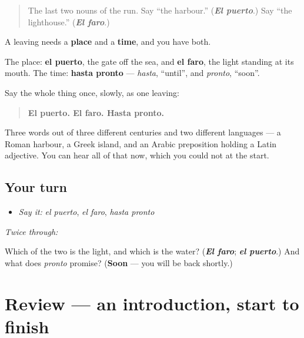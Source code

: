 \begin{quote}
The last two nouns of the run. Say \textquotedblleft{}the harbour.\textquotedblright{} (\emph{\textbf{El puerto}}.) Say \textquotedblleft{}the lighthouse.\textquotedblright{} (\emph{\textbf{El faro}}.)
\end{quote}

\begin{grammarlens}[title={What you've built}]
A leaving needs a \textbf{place} and a \textbf{time}, and you have both.

The place: \textbf{el puerto}, the gate off the sea, and \textbf{el faro}, the light standing at its mouth. The time: \textbf{hasta pronto} — \emph{hasta}, \textquotedblleft{}until\textquotedblright{}, and \emph{pronto}, \textquotedblleft{}soon\textquotedblright{}.

Say the whole thing once, slowly, as one leaving:

\begin{quote}
\textbf{El puerto. El faro. Hasta pronto.}
\end{quote}

Three words out of three different centuries and two different languages — a Roman harbour, a Greek island, and an Arabic preposition holding a Latin adjective. You can hear all of that now, which you could not at the start.
\end{grammarlens}

\subsection*{Your turn}
\begin{itemize}
\raggedright
  \item \emph{Say it:} \emph{el puerto}, \emph{el faro}, \emph{hasta pronto}
\end{itemize}

\emph{Twice through:}

\begin{tcolorbox}[breakable,colback=teal!4,colframe=teal!35!black,title={Before you move on}]
Which of the two is the light, and which is the water? (\emph{\textbf{El faro}}; \emph{\textbf{el puerto}}.) And what does \emph{pronto} promise? (\textbf{Soon} — you will be back shortly.)
\end{tcolorbox}
\section[(review)]{Review — an introduction, start to finish}

